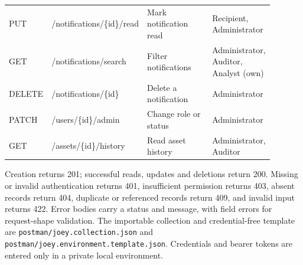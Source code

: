 \begin{small}
\begin{longtable}{>{\raggedright\arraybackslash}p{0.10\linewidth}>{\raggedright\arraybackslash}p{0.28\linewidth}>{\raggedright\arraybackslash}p{0.32\linewidth}>{\raggedright\arraybackslash}p{0.19\linewidth}}
PUT & /notifications/\{id\}/read & Mark notification read & Recipient, Administrator \\
GET & /notifications/search & Filter notifications & Administrator, Auditor, Analyst (own) \\
DELETE & /notifications/\{id\} & Delete a notification & Administrator \\
\midrule
PATCH & /users/\{id\}/admin & Change role or status & Administrator \\
GET & /assets/\{id\}/history & Read asset history & Administrator, Auditor \\
\bottomrule
\end{longtable}
\end{small}

Creation returns 201; successful reads, updates and deletions return 200. Missing or invalid authentication returns 401, insufficient permission returns 403, absent records return 404, duplicate or referenced records return 409, and invalid input returns 422. Error bodies carry a status and message, with field errors for request-shape validation. The importable collection and credential-free template are \texttt{postman/joey.collection.json} and \texttt{postman/joey.environment.template.json}. Credentials and bearer tokens are entered only in a private local environment.
